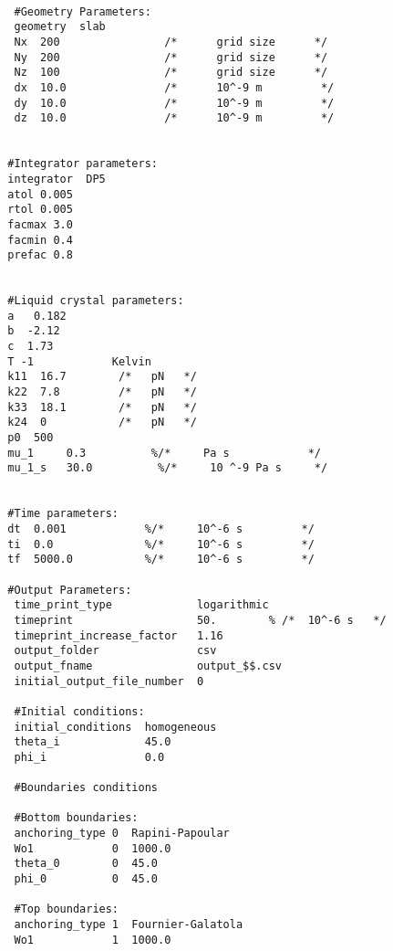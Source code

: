 \documentclass{article}
\begin{document}
\begin{lstlisting}	

   #Geometry Parameters:
   geometry  slab
   Nx  200                /*      grid size      */
   Ny  200                /*      grid size      */
   Nz  100                /*      grid size      */
   dx  10.0               /*      10^-9 m         */
   dy  10.0               /*      10^-9 m         */
   dz  10.0               /*      10^-9 m         */


  #Integrator parameters:
  integrator  DP5
  atol 0.005
  rtol 0.005
  facmax 3.0
  facmin 0.4
  prefac 0.8


  #Liquid crystal parameters:
  a   0.182
  b  -2.12
  c  1.73
  T -1            Kelvin
  k11  16.7        /*   pN   */
  k22  7.8         /*   pN   */
  k33  18.1        /*   pN   */
  k24  0           /*   pN   */ 
  p0  500
  mu_1     0.3          %/*     Pa s            */
  mu_1_s   30.0          %/*     10 ^-9 Pa s     */


  #Time parameters:
  dt  0.001            %/*     10^-6 s         */	
  ti  0.0              %/*     10^-6 s         */	
  tf  5000.0           %/*     10^-6 s         */

  #Output Parameters:
   time_print_type             logarithmic
   timeprint                   50.        % /*  10^-6 s   */
   timeprint_increase_factor   1.16            
   output_folder               csv
   output_fname                output_$$.csv
   initial_output_file_number  0	

   #Initial conditions:
   initial_conditions  homogeneous
   theta_i             45.0
   phi_i               0.0	

   #Boundaries conditions

   #Bottom boundaries:
   anchoring_type 0  Rapini-Papoular
   Wo1            0  1000.0
   theta_0        0  45.0
   phi_0          0  45.0	

   #Top boundaries:
   anchoring_type 1  Fournier-Galatola
   Wo1            1  1000.0

\end{lstlisting}
\end{document}
